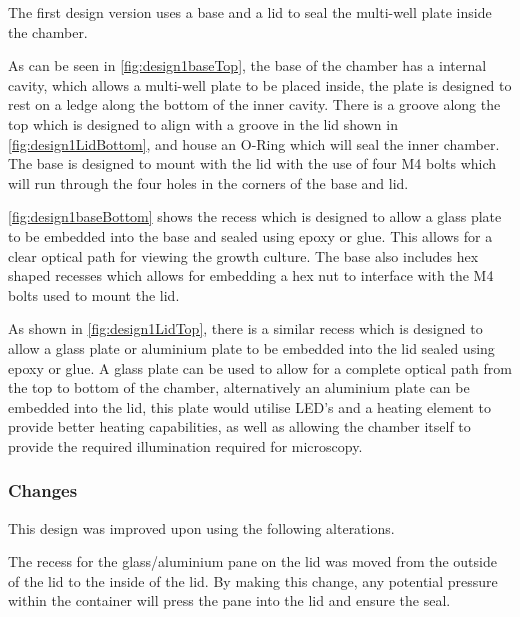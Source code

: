 \documentclass[class=report,11pt,crop=false]{standalone}
\begin{document}
The first design version uses a base and a lid to seal the multi-well plate inside the chamber. 


As can be seen in \autoref{fig:design1baseTop}, the base of the chamber has a internal cavity, which allows a multi-well plate to be placed inside, the plate is designed to rest on a ledge along the bottom of the inner cavity. There is a groove along the top which is designed to align with a groove in the lid shown in \autoref{fig:design1LidBottom}, and house an O-Ring which will seal the inner chamber. The base is designed to mount with the lid with the use of four M4 bolts which will run through the four holes in the corners of the base and lid.

\autoref{fig:design1baseBottom} shows the recess which is designed to allow a glass plate to be embedded into the base and sealed using epoxy or glue. This allows for a clear optical path for viewing the growth culture. The base also includes hex shaped recesses which allows for embedding a hex nut to interface with the M4 bolts used to mount the lid.

As shown in \autoref{fig:design1LidTop}, there is a similar recess which is designed to allow a glass plate or aluminium plate to be embedded into the lid sealed using epoxy or glue. A glass plate can be used to allow for a complete optical path from the top to bottom of the chamber, alternatively an aluminium plate can be embedded into the lid, this plate would utilise LED's and a heating element to provide better heating capabilities, as well as allowing the chamber itself to provide the required illumination required for microscopy.

\subsubsection{Changes}
This design was improved upon using the following alterations.

The recess for the glass/aluminium pane on the lid was moved from the outside of the lid to the inside of the lid. By making this change, any potential pressure within the container will press the pane into the lid and ensure the seal.
\end{document}
